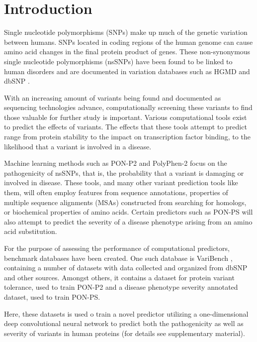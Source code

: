 \documentclass{bioinfo}
\begin{document}
\maketitle

\section{Introduction}

Single nucleotide polymorphisms (SNPs) make up much of the genetic
variation between humans. SNPs located in coding regions of the human
genome can cause amino acid changes in the final protein product of
genes. These non-synonymous single nucleotide polymorphisms (nsSNPs)
have been found to be linked to human disorders and are documented in
variation databases such as HGMD \citep{Stenson2003} and dbSNP
\citep{Sherry2001}. 

With an increasing amount of variants being found and documented as
sequencing technologies advance, computationally screening these
variants to find those valuable for further study is
important. Various computational tools exist to predict the effects of
variants. The effects that these tools attempt to predict range from
protein stability to the impact on transcription factor binding, to
the likelihood that a variant is involved in a disease. 

Machine learning methods such as PON-P2 \citep{Niroula2015} and
PolyPhen-2 \citep{Adzhubei2013} focus on the pathogenicity of nsSNPs,
that is, the probability that a variant is damaging or involved in
disease. These tools, and many other variant prediction tools like
them, will often employ features from sequence annotations, properties
of multiple sequence alignments (MSAs) constructed from searching for
homologs, or biochemical properties of amino acids. Certain predictors
such as PON-PS \citep{Niroula2017} will also attempt to predict the
severity of a disease phenotype arising from an amino acid
substitution.  

For the purpose of assessing the performance of computational predictors, benchmark databases have been created. One such database is VariBench \citep{Nair2013}, containing a number of datasets with data collected and organized from dbSNP and other sources. Amongst others, it contains a dataset for protein variant tolerance, used to train PON-P2 and a disease phenotype severity annotated dataset, used to train PON-PS.

Here, these datasets is used o train a novel predictor utilizing a
one-dimensional deep convolutional neural network to predict both the
pathogenicity as well as severity of variants in human proteins (for
details see supplementary material). 
\end{document}
